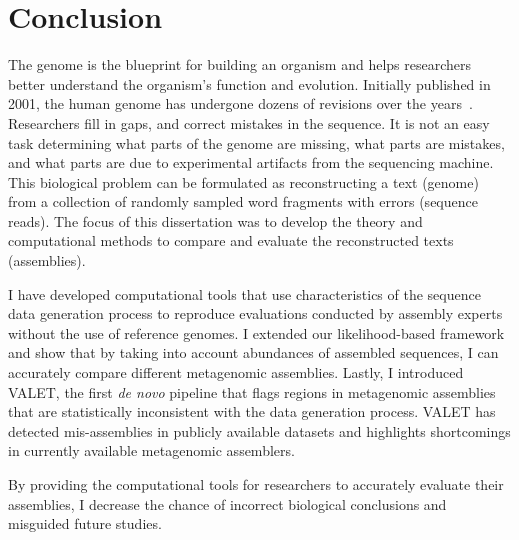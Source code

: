 
\renewcommand{\thechapter}{7}

\chapter{Conclusion}

The genome is the blueprint for building an organism and helps researchers better understand the organism's function and evolution.
Initially published in 2001, the human genome has undergone dozens of revisions over the years~\cite{monya2012}.
Researchers fill in gaps, and correct mistakes in the sequence.
It is not an easy task determining what parts of the genome are missing, what parts are mistakes, and what parts are due to experimental artifacts from the sequencing machine.
This biological problem can be formulated as reconstructing a text (genome) from a collection of randomly sampled word fragments with errors (sequence reads).
The focus of this dissertation was to develop the theory and computational methods to compare and evaluate the reconstructed texts (assemblies).

I have developed computational tools that use characteristics of the sequence data generation process to reproduce evaluations conducted by assembly experts without the use of reference genomes.
I extended our likelihood-based framework and show that by taking into account abundances of assembled sequences, I can accurately compare different metagenomic assemblies.
Lastly, I introduced VALET, the first \emph{de novo} pipeline that flags regions in metagenomic assemblies that are statistically inconsistent with the data generation process.
VALET has detected mis-assemblies in publicly available datasets and highlights shortcomings in currently available metagenomic assemblers.

By providing the computational tools for researchers to accurately evaluate their assemblies, I decrease the chance of incorrect biological conclusions and misguided future studies.

